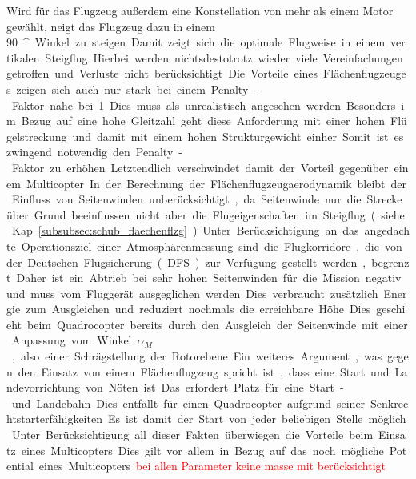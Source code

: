 Wird für das Flugzeug außerdem eine Konstellation von mehr als einem Motor gewählt, neigt das Flugzeug dazu in einem \SI{90}{^\circ} Winkel zu steigen. Damit zeigt sich die optimale Flugweise in einem vertikalen Steigflug. Hierbei werden nichtsdestotrotz wieder viele Vereinfachungen getroffen und Verluste nicht berücksichtigt. Die Vorteile eines Flächenflugzeuges zeigen sich auch nur stark bei einem Penalty-Faktor nahe bei 1. Dies muss als unrealistisch angesehen werden. Besonders im Bezug auf eine hohe Gleitzahl geht diese Anforderung mit einer hohen Flügelstreckung und damit mit einem hohen Strukturgewicht einher. Somit ist es zwingend notwendig den Penalty-Faktor zu erhöhen. Letztendlich verschwindet damit der Vorteil gegenüber einem Multicopter. 
In der Berechnung der Flächenflugzeugaerodynamik bleibt der Einfluss von Seitenwinden unberücksichtigt, da Seitenwinde nur die Strecke über Grund beeinflussen nicht aber die Flugeigenschaften im Steigflug (siehe Kap. \ref{subsubsec:schub_flaechenflzg}). Unter Berücksichtigung an das angedachte Operationsziel einer Atmosphärenmessung sind die Flugkorridore, die von der Deutschen Flugsicherung (DFS) zur Verfügung gestellt werden, begrenzt. Daher ist ein Abtrieb bei sehr hohen Seitenwinden für die Mission negativ und muss vom Fluggerät ausgeglichen werden. Dies verbraucht zusätzlich Energie zum Ausgleichen und reduziert nochmals die erreichbare Höhe. Dies geschieht beim Quadrocopter bereits durch den Ausgleich der Seitenwinde mit einer Anpassung vom Winkel \ensuremath{\alpha_{M}}, also einer Schrägstellung der Rotorebene. Ein weiteres Argument, was gegen den Einsatz von einem Flächenflugzeug spricht ist, dass eine Start und Landevorrichtung von Nöten ist. Das erfordert Platz für eine Start- und Landebahn. Dies entfällt für einen Quadrocopter aufgrund seiner Senkrechtstarterfähigkeiten. Es ist damit der Start von jeder beliebigen Stelle möglich.
Unter Berücksichtigung all dieser Fakten überwiegen die Vorteile beim Einsatz eines Multicopters. Dies gilt vor allem in Bezug auf das noch mögliche Potential eines Multicopters.
\textcolor{red}{bei allen Parameter keine masse mit berücksichtigt}



\newpage
